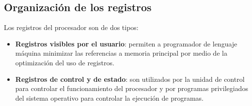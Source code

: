 \subsection{Organización de los registros}

Los registros del procesador son de dos tipos:

\begin{itemize}
  \item \textbf{Registros visibles por el usuario}: permiten a programador de lenguaje máquina minimizar las referencias a memoria principal por medio de la optimización del uso de registros.
  \item \textbf{Registros de control y de estado}: son utilizados por la unidad de control para controlar el funcionamiento del procesador y por programas privilegiados del sistema operativo para controlar la ejecución de programas.
\end{itemize}

